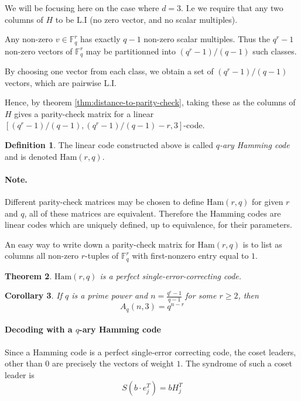 \documentclass[11pt,a4paper]{article}
\theoremstyle{definition}
\newtheorem{definition}{Definition}[section]
\theoremstyle{plain}
\newtheorem{theorem}[definition]{Theorem}
\newtheorem{corollary}[definition]{Corollary}
\theoremstyle{remark}
\begin{document}
We will be focusing here on the case where $d = 3$. I.e we require that any two columns of $H$ to be 
L.I (no zero vector, and no scalar multiples). 

Any non-zero $v \in \mathbb{F}_q^r$ has exactly $q-1$ non-zero scalar multiples. Thus the $q^r - 1$ non-zero vectors
of $\mathbb{F}_q^r$ may be partitionned into $(q^r - 1) / (q-1)$ such classes. 

By choosing one vector from each class, we obtain a set of $(q^r - 1) / (q-1)$ 
vectors, which are pairwise L.I. 

Hence, by theorem \ref{thm:distance-to-parity-check}, taking these as the columns of $H$ gives a parity-check matrix
for a linear $[(q^r - 1)/(q-1), (q^r - 1)/(q-1) - r, 3]$-code. 

\begin{definition}
    The linear code constructed above is called \emph{$q$-ary Hamming code} 
    and is denoted $\text{Ham}(r,q)$.  
\end{definition}

\paragraph{Note.} Different parity-check matrices may be chosen to define $\text{Ham}(r,q)$ 
for given $r$ and $q$, all of these matrices are equivalent. Therefore the Hamming codes are linear codes 
which are uniquely defined, up to equivalence, for their parameters. 

An easy way to write down a parity-check matrix for $\text{Ham}(r, q)$ is to list as columns all non-zero $r$-tuples 
of $\mathbb{F}_q^r$ with first-nonzero entry equal to $1$. 

\begin{theorem}\label{thm:Hamming-perfect}
    $\text{Ham}(r,q)$ is a perfect single-error-correcting code. 
\end{theorem}

\begin{corollary}
    If $q$ is a prime power and $n = \frac{q^r - 1}{q - 1}$ for some $r \geq 2$, 
    then 
    $$A_q(n, 3) = q^{n-r}$$
\end{corollary}

\paragraph{Decoding with a $q$-ary  Hamming code}

Since a Hamming code is a perfect single-error correcting code, the coset leaders, other than 
$0$ are precisely the vectors of weight $1$.  The syndrome of such a coset leader is 
$$S(b \cdot e_j^T) = b H_j^T$$
\end{document}
